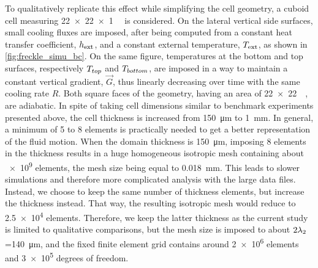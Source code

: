 To qualitatively replicate this effect while simplifying the cell geometry, a cuboid cell measuring \SI{22 x 22 x 1}{\milli \uvolume}  
is considered. On the lateral vertical side surfaces, small cooling fluxes are imposed, after being computed from a constant heat transfer 
coefficient, $h_{\text{ext}}$, and a constant external temperature, $T_{\text{ext}}$, as shown in \cref{fig:freckle_simu_bc}. On the same figure, 
temperatures at the bottom and top surfaces, respectively $T_{top}$  and $T_{bottom}$, are imposed in a way to maintain a 
constant vertical gradient, $\vec{G}$, thus linearly 
decreasing over time with the same cooling rate $R$. Both square faces of the geometry, having an area of \SI{22 x 22}{\milli \uarea}, 
are adiabatic. In spite of taking cell dimensions similar to benchmark experiments presented above, the cell thickness 
is increased from \SI{150}{\micro \metre} to \SI{1}{\milli \metre}. 
In general, a minimum of 5 to 8 elements is practically needed to get a better representation of the fluid motion.
When the domain thickness is \SI{150}{\micro \metre}, imposing 8 elements in the thickness results in a huge homogeneous isotropic mesh containing
about \num{e9} elements, the mesh size being equal to \SI{0.018}{\milli \metre}. %
This leads to slower simulations and therefore more complicated analysis with the large data files. 
Instead, we choose to keep the same number of thickness elements,
but increase the thickness instead. That way, the resulting isotropic mesh would reduce to \num{2.5e4} elements. Therefore, we keep the latter
thickness as the current study is limited to qualitative comparisons, but the mesh size is imposed to about $2{\lambda}_{2}$=\SI{140}{\micro \metre}, and 
the fixed finite element grid contains around \num{2e6} elements and \num{3e5} degrees of freedom. 


